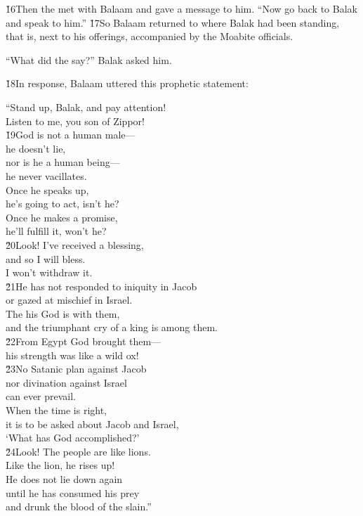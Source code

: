 \v{16}Then the  met with Balaam and gave a message to him. ``Now go back to Balak and speak to him.'' \v{17}So Balaam returned to where Balak had been standing, that is, next to his offerings, accompanied by the Moabite officials.

``What did the  say?'' Balak asked him.

\v{18}In response, Balaam uttered this prophetic statement:

\begin{poetry}
\poeml ``Stand up, Balak, and pay attention! \\
\poemll    Listen to me, you son of Zippor! \\
\poeml \v{19}God is not a human male--- \\
\poemll    he doesn't lie, \\
\poeml nor is he a human being--- \\
\poemll    he never vacillates. \\
\poeml Once he speaks up, \\
\poemll    he's going to act, isn't he? \\
\poeml Once he makes a promise, \\
\poemll    he'll fulfill it, won't he? \\
\poeml \v{20}Look! I've received a blessing, \\
\poemll    and so I will bless. \\
\poemlll       I won't withdraw it. \\
\poeml \v{21}He has not responded to iniquity in Jacob \\
\poemll    or gazed at mischief in Israel. \\
\poeml The  his God is with them, \\
\poemll    and the triumphant cry of a king is among them. \\
\poeml \v{22}From Egypt God brought them--- \\
\poemll    his strength was like a wild ox! \\
\poeml \v{23}No Satanic plan against Jacob \\
\poemll    nor divination against Israel \\
\poemlll       can ever prevail. \\
\poeml When the time is right, \\
\poemll    it is to be asked about Jacob and Israel, \\
\poemlll       `What has God accomplished?' \\
\poeml \v{24}Look! The people are like lions. \\
\poemll    Like the lion, he rises up! \\
\poeml He does not lie down again \\
\poemll    until he has consumed his prey \\
\poemlll       and drunk the blood of the slain.''
\end{poetry}

